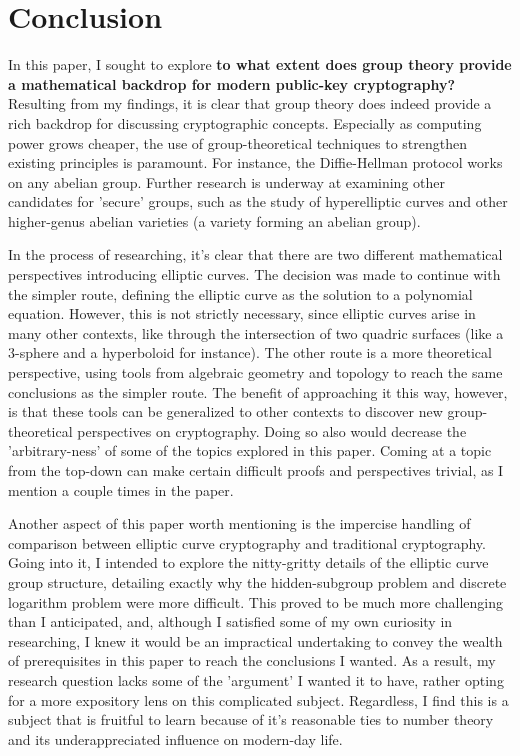 \documentclass[11pt, a4paper]{report}
\begin{document}
\section{Conclusion}

In this paper, I sought to explore \textbf{to what extent does group theory provide a mathematical backdrop for modern public-key cryptography?} Resulting from my findings, it is clear that group theory does indeed provide a rich backdrop for discussing cryptographic concepts. Especially as computing power grows cheaper, the use of group-theoretical techniques to strengthen existing principles is paramount. For instance, the Diffie-Hellman protocol works on any abelian group. Further research is underway at examining other candidates for 'secure' groups, such as the study of hyperelliptic curves and other higher-genus abelian varieties (a variety forming an abelian group).

In the process of researching, it's clear that there are two different mathematical perspectives introducing elliptic curves. The decision was made to continue with the simpler route, defining the elliptic curve as the solution to a polynomial equation. However, this is not strictly necessary, since elliptic curves arise in many other contexts, like through the intersection of two quadric surfaces (like a 3-sphere and a hyperboloid for instance). The other route is a more theoretical perspective, using tools from algebraic geometry and topology to reach the same conclusions as the simpler route. The benefit of approaching it this way, however, is that these tools can be generalized to other contexts to discover new group-theoretical perspectives on cryptography. Doing so also would decrease the 'arbitrary-ness' of some of the topics explored in this paper. Coming at a topic from the top-down can make certain difficult proofs and perspectives trivial, as I mention a couple times in the paper.

Another aspect of this paper worth mentioning is the impercise handling of comparison between elliptic curve cryptography and traditional cryptography. Going into it, I intended to explore the nitty-gritty details of the elliptic curve group structure, detailing exactly why the hidden-subgroup problem and discrete logarithm problem were more difficult. This proved to be much more challenging than I anticipated, and, although I satisfied some of my own curiosity in researching, I knew it would be an impractical undertaking to convey the wealth of prerequisites in this paper to reach the conclusions I wanted. As a result, my research question lacks some of the 'argument' I wanted it to have, rather opting for a more expository lens on this complicated subject. Regardless, I find this is a subject that is fruitful to learn because of it's reasonable ties to number theory and its underappreciated influence on modern-day life.


\newpage 

\printbibliography
\end{document}
